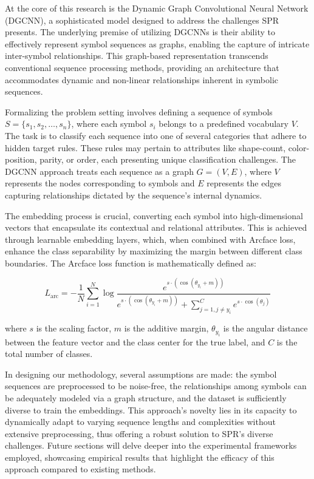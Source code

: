 \documentclass{article}
\begin{document}
At the core of this research is the Dynamic Graph Convolutional Neural Network (DGCNN), a sophisticated model designed to address the challenges SPR presents. The underlying premise of utilizing DGCNNs is their ability to effectively represent symbol sequences as graphs, enabling the capture of intricate inter-symbol relationships. This graph-based representation transcends conventional sequence processing methods, providing an architecture that accommodates dynamic and non-linear relationships inherent in symbolic sequences.

Formalizing the problem setting involves defining a sequence of symbols \( S = \{s_1, s_2, \ldots, s_n\} \), where each symbol \( s_i \) belongs to a predefined vocabulary \( V \). The task is to classify each sequence into one of several categories that adhere to hidden target rules. These rules may pertain to attributes like shape-count, color-position, parity, or order, each presenting unique classification challenges. The DGCNN approach treats each sequence as a graph \( G = (V, E) \), where \( V \) represents the nodes corresponding to symbols and \( E \) represents the edges capturing relationships dictated by the sequence's internal dynamics.

The embedding process is crucial, converting each symbol into high-dimensional vectors that encapsulate its contextual and relational attributes. This is achieved through learnable embedding layers, which, when combined with Arcface loss, enhance the class separability by maximizing the margin between different class boundaries. The Arcface loss function is mathematically defined as:

\[ L_{\text{arc}} = -\frac{1}{N} \sum_{i=1}^{N} \log \frac{e^{s \cdot (\cos(\theta_{y_i} + m))}}{e^{s \cdot (\cos(\theta_{y_i} + m))} + \sum_{j=1, j \neq y_i}^{C} e^{s \cdot \cos(\theta_j)}} \]

where \( s \) is the scaling factor, \( m \) is the additive margin, \( \theta_{y_i} \) is the angular distance between the feature vector and the class center for the true label, and \( C \) is the total number of classes.

In designing our methodology, several assumptions are made: the symbol sequences are preprocessed to be noise-free, the relationships among symbols can be adequately modeled via a graph structure, and the dataset is sufficiently diverse to train the embeddings. This approach's novelty lies in its capacity to dynamically adapt to varying sequence lengths and complexities without extensive preprocessing, thus offering a robust solution to SPR's diverse challenges. Future sections will delve deeper into the experimental frameworks employed, showcasing empirical results that highlight the efficacy of this approach compared to existing methods.
\end{document}
